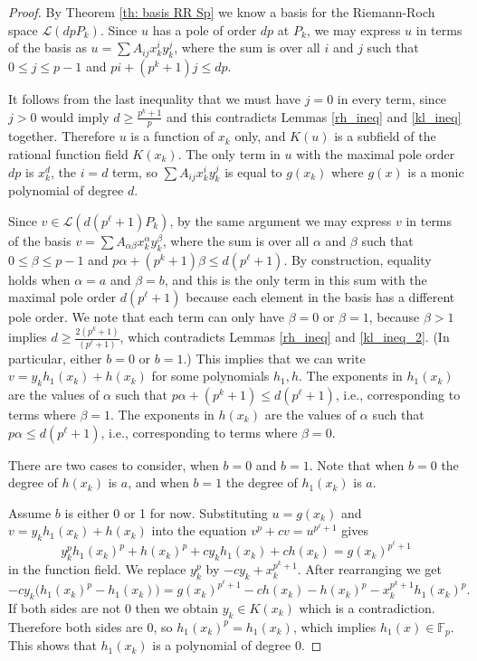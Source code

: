 \documentclass[oneside,a4paper,12pt]{article}
\newcommand{\F}{{\mathbb{F}}}
\theoremstyle{plain} %
\theoremstyle{definition} %
\begin{document}
\begin{proof}
    

    
 
    By Theorem \ref{th: basis RR Sp} we know a basis for the Riemann-Roch space  
    $\mathcal{L}(dpP_{k})$.
Since $u$ has a pole of order $dp$ at $P_{k}$, we may express $u$ in terms of the basis
    as $u=\sum A_{ij} x_k^iy_k^j$, where the sum is over 
    all $i$ and $j$ such that $0\leq j \leq p-1$ and 
    $pi+(p^k+   1)j\leq dp$. 
      
It follows from the last inequality that we must have $j=0$ in every term, since $j>0$ would imply $d\ge \frac{p^k+1}{p}$
and this contradicts Lemmas \ref{rh_ineq} and \ref{kl_ineq} together.
Therefore $u$ is a function of $x_k$ only, and $K(u)$ is a subfield of the 
rational function field $K(x_k)$.
The only term in $u$ with the maximal pole order $dp$ is $x_k^d$, the $i=d$ term,
so  $\sum A_{ij} x_k^iy_k^j$ is equal to $g(x_k)$ where $g(x)$ is a 
monic polynomial of degree $d$.



Since $v\in \mathcal{L}(d(p^\ell +1)P_{k})$, by the same argument we 
may express $v$ in terms of the basis
    $v=\sum A_{\alpha \beta } x_k^\alpha y_k^\beta$, where the sum is over 
    all $\alpha$ and $\beta$ such that
    $0\leq \beta \leq p-1$ and $p\alpha+(p^k+   1)\beta\leq d(p^\ell +1)$.
    By construction, equality holds when $\alpha =a$ and $\beta =b$,
     and  this is the only term in this 
     sum with the maximal pole order $d(p^\ell +1)$ because each element in the basis
     has a different pole order.
We note that each term can only have $\beta=0$ or $\beta=1$, because
$\beta >1$ implies $d\ge \frac{2(p^k+1)}{(p^\ell +1)}$, which contradicts 
Lemmas \ref{rh_ineq} and \ref{kl_ineq_2}.
(In particular,  either $b=0$ or $b=1$.)
This implies that we can write $v=y_kh_1(x_k)+h(x_k)$ for some polynomials $h_1, h$.
The exponents in $h_1(x_k)$ are the values of $\alpha$ such that
$p\alpha+(p^k+   1)\leq d(p^\ell +1)$, i.e., 
corresponding to terms where $\beta =1$.
The exponents in $h(x_k)$ are the values of $\alpha$ such that
$p\alpha\leq d(p^\ell +1)$, i.e., 
corresponding to terms where $\beta =0$. 

There are two cases to consider, when $b=0$ and $b=1$. 
Note that when $b=0$ the degree of $h(x_k)$ is $a$, and when $b=1$ 
the degree of $h_1(x_k)$ is $a$. 

Assume $b$ is either 0 or 1 for now.
Substituting $u=g(x_k)$ 
and $v=y_kh_1(x_k)+h(x_k)$  into the equation
$v^p+c v=u^{p^\ell+1}$
gives
$$
y_k^p h_1(x_k)^p +h(x_k)^p+c y_k h_1(x_k) +c h(x_k)=
g(x_k)^{p^\ell +1}
$$
in the function field.
We replace $y_k^p$ by $-c y_k+x_k^{p^k+1}$. After rearranging we get
$$-c y_k \biggl(h_1(x_k)^p - h_1(x_k)\biggr)= g(x_k)^{p^\ell +1}-c h(x_k)-h(x_k)^p-x_k^{p^k+1}h_1(x_k)^p.$$
If both sides are not 0 then we obtain $y_k \in K(x_k)$ which is a contradiction. 
Therefore both sides are 0, so
$h_1(x_k)^p = h_1(x_k)$, which implies $h_1(x) \in \F_p$.
This shows that $h_1(x_k)$ is a polynomial of degree 0.


\end{proof}
\end{document}
